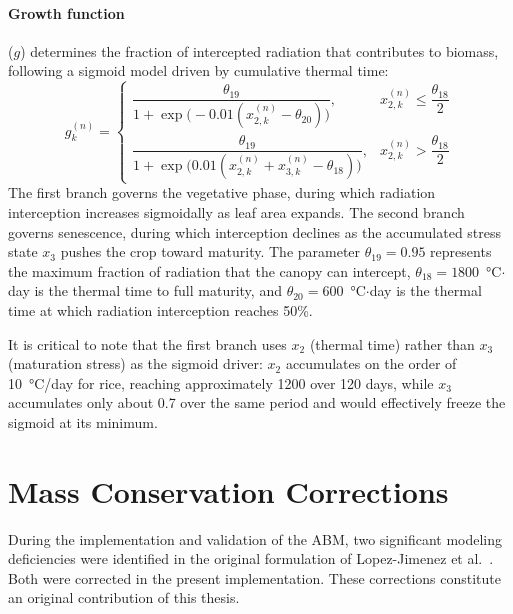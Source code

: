 \paragraph{Growth function} ($g$) determines the fraction of intercepted radiation that contributes to biomass, following a sigmoid model driven by cumulative thermal time:
\begin{equation}
    g_k^{(n)} = 
    \begin{cases}
        \dfrac{\theta_{19}}{1 + \exp\!\bigl(-0.01(x_{2,k}^{(n)} - \theta_{20})\bigr)}, & x_{2,k}^{(n)} \leq \dfrac{\theta_{18}}{2} \\[10pt]
        \dfrac{\theta_{19}}{1 + \exp\!\bigl(0.01(x_{2,k}^{(n)} + x_{3,k}^{(n)} - \theta_{18})\bigr)}, & x_{2,k}^{(n)} > \dfrac{\theta_{18}}{2}
    \end{cases}
    \label{eq:growth}
\end{equation}
The first branch governs the vegetative phase, during which radiation interception increases sigmoidally as leaf area expands. The second branch governs senescence, during which interception declines as the accumulated stress state $x_3$ pushes the crop toward maturity. The parameter $\theta_{19} = 0.95$ represents the maximum fraction of radiation that the canopy can intercept, $\theta_{18} = 1800$~°C$\cdot$day is the thermal time to full maturity, and $\theta_{20} = 600$~°C$\cdot$day is the thermal time at which radiation interception reaches 50\%.

It is critical to note that the first branch uses $x_2$ (thermal time) rather than $x_3$ (maturation stress) as the sigmoid driver: $x_2$ accumulates on the order of 10~°C/day for rice, reaching approximately 1200 over 120 days, while $x_3$ accumulates only about 0.7 over the same period and would effectively freeze the sigmoid at its minimum.


\section{Mass Conservation Corrections}
\label{sec:mass_correction}

During the implementation and validation of the ABM, two significant modeling deficiencies were identified in the original formulation of Lopez-Jimenez et al.~\cite{Lopezjimenez2024}. Both were corrected in the present implementation. These corrections constitute an original contribution of this thesis.


